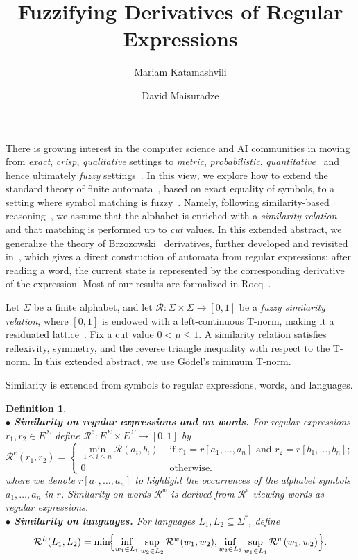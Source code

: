 \documentclass{easychair}
\title{Fuzzifying Derivatives of Regular Expressions}
\author{
Mariam Katamashvili\inst{1,2}
\and David Maisuradze\inst{1}
}
\institute{
Kutaisi International University, Kutaisi, Georgia
\and
VIAM, Tbilisi State University, Tbilisi, Georgia
}
\newtheorem{definition}{Definition}
\begin{document}
\maketitle
There is growing interest in the computer science and AI communities in moving from {\em exact}, {\em crisp}, {\em qualitative} settings to {\em metric}, {\em probabilistic}, {\em quantitative}~\cite{AlvesKesnerRamos2025,SilvaBonchiBonsangueRutten2011} and hence ultimately {\em fuzzy} settings~\cite{met05}. In this view, we explore how to extend the standard theory of finite automata~\cite{C71}, based on exact equality of symbols, to a setting where symbol matching is fuzzy~\cite{DHMM}. Namely, following similarity-based reasoning~\cite{Sessa2002},
we assume that the alphabet is enriched with a {\em similarity relation}
and that matching is performed up to {\em cut} values. In this extended abstract, we generalize the theory of
Brzozowski~\cite{B64} derivatives, further developed and revisited
in~\cite{OwensReppyTuron}, which gives a direct construction of automata
from regular expressions: after reading a word, the current state is represented by the
corresponding derivative of the expression. Most of our results are formalized in Rocq~\cite{Rocq}.

Let $\Sigma$ be a finite alphabet, and let
$\mathcal R:\Sigma\times\Sigma\to[0,1]$
be a {\em fuzzy similarity relation}, where $[0,1]$ is endowed with a
left-continuous T-norm, making it a residuated lattice~\cite{met05}.
Fix a cut value $0<\mu\le1$. A similarity relation satisfies reflexivity, symmetry, and the reverse triangle inequality with respect to the T-norm. In this extended abstract, we use G\"odel's minimum T-norm.

Similarity is extended from symbols to regular expressions, words, and languages.
\begin{definition}\hfill\\
$\bullet$ \textbf{Similarity on regular expressions and on words.}
For regular expressions $r_1,r_2\in E^\Sigma$ define
$
\mathcal R^e:E^\Sigma\times E^\Sigma\to[0,1]$
 by \[\mathcal R^{e}(r_1,r_2)=\begin{cases}\min_{1\le i\le n}\mathcal R(a_i,b_i) &\text{ if } r_1=r[a_1,\ldots,a_n]\text{ and }r_2=r[b_1,\ldots,b_n];
\\ 
0& \text{ otherwise. }
\end{cases}
\] where we denote $r[a_1,\ldots,a_n]$ to highlight the occurrences of the alphabet symbols $a_1,\ldots,a_n$ in $r$. Similarity on words $\mathcal R^w$ is derived from $\mathcal R^e$ viewing words as regular expressions.\\
$\bullet$ \textbf{Similarity on languages.}
For languages $L_1,L_2\subseteq\Sigma^\ast$, define
\[
\mathcal R^L(L_1,L_2)
=
\min\!\Bigl\{
\inf_{w_1\in L_1}\sup_{w_2\in L_2}\mathcal R^w(w_1,w_2),
\inf_{w_2\in L_2}\sup_{w_1\in L_1}\mathcal R^w(w_1,w_2)
\Bigr\}.
\]\end{definition}
\end{document}
